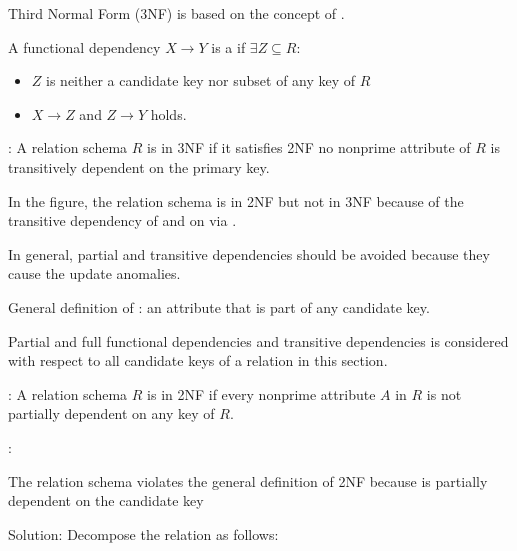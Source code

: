    \par Third Normal Form (3NF) is based on the concept of .
    \par A functional dependency $X \to Y$ is a  if $\exists Z \subseteq R$:
    \begin{itemize}
      \item $Z$ is neither a candidate key nor subset of any key of $R$
      \item $X \to Z$ and $Z \to Y$ holds.
    \end{itemize}
    \par {}: A relation schema $R$ is in 3NF if it satisfies 2NF  no nonprime attribute of $R$ is transitively dependent on the primary key.
    \par In the figure, the relation schema  is in 2NF but not in 3NF because of the transitive dependency of  and  on  via .

    \par In general, partial and transitive dependencies should be avoided because they cause the update anomalies.
    \par General definition of : an attribute that is part of any candidate key.
    \par Partial and full functional dependencies and transitive dependencies is considered with respect to all candidate keys of a relation in this section.

    \par {}: A relation schema $R$ is in 2NF if every nonprime attribute $A$ in $R$ is not partially dependent on any key of $R$.
    \par {}:
    \par The  relation schema violates the general definition of 2NF because  is partially dependent on the candidate key
    \par Solution: Decompose the relation as follows:

